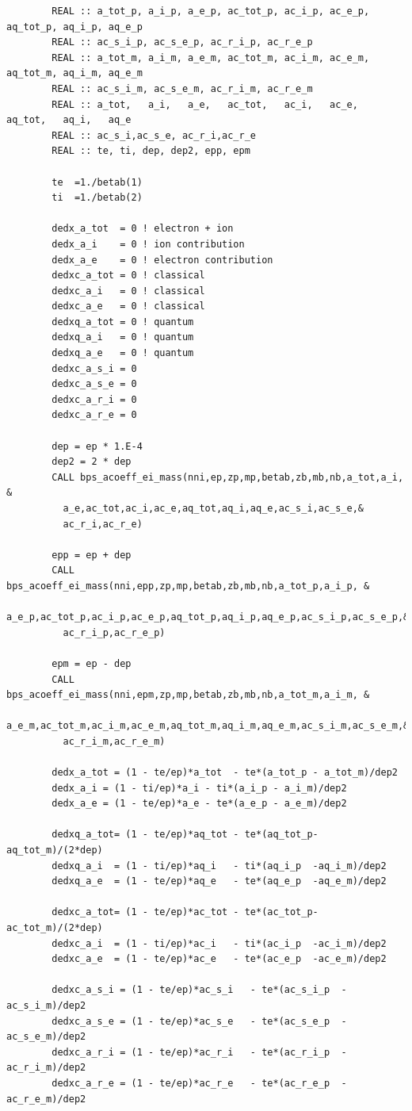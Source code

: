 \documentclass[preprint,12pt,eqsecnum,nofootinbib,amsmath,amssymb]{revtex4}
\begin{document}
{\begin{verbatim}
        REAL :: a_tot_p, a_i_p, a_e_p, ac_tot_p, ac_i_p, ac_e_p, aq_tot_p, aq_i_p, aq_e_p
        REAL :: ac_s_i_p, ac_s_e_p, ac_r_i_p, ac_r_e_p
        REAL :: a_tot_m, a_i_m, a_e_m, ac_tot_m, ac_i_m, ac_e_m, aq_tot_m, aq_i_m, aq_e_m
        REAL :: ac_s_i_m, ac_s_e_m, ac_r_i_m, ac_r_e_m
        REAL :: a_tot,   a_i,   a_e,   ac_tot,   ac_i,   ac_e,   aq_tot,   aq_i,   aq_e
        REAL :: ac_s_i,ac_s_e, ac_r_i,ac_r_e
        REAL :: te, ti, dep, dep2, epp, epm

        te  =1./betab(1)
        ti  =1./betab(2)

        dedx_a_tot  = 0 ! electron + ion
        dedx_a_i    = 0 ! ion contribution
        dedx_a_e    = 0 ! electron contribution
        dedxc_a_tot = 0 ! classical
        dedxc_a_i   = 0 ! classical
        dedxc_a_e   = 0 ! classical
        dedxq_a_tot = 0 ! quantum
        dedxq_a_i   = 0 ! quantum
        dedxq_a_e   = 0 ! quantum
        dedxc_a_s_i = 0 
        dedxc_a_s_e = 0 
        dedxc_a_r_i = 0 
        dedxc_a_r_e = 0 

        dep = ep * 1.E-4
        dep2 = 2 * dep
        CALL bps_acoeff_ei_mass(nni,ep,zp,mp,betab,zb,mb,nb,a_tot,a_i, &
          a_e,ac_tot,ac_i,ac_e,aq_tot,aq_i,aq_e,ac_s_i,ac_s_e,&
          ac_r_i,ac_r_e)

        epp = ep + dep
        CALL bps_acoeff_ei_mass(nni,epp,zp,mp,betab,zb,mb,nb,a_tot_p,a_i_p, &
          a_e_p,ac_tot_p,ac_i_p,ac_e_p,aq_tot_p,aq_i_p,aq_e_p,ac_s_i_p,ac_s_e_p,&
          ac_r_i_p,ac_r_e_p)

        epm = ep - dep
        CALL bps_acoeff_ei_mass(nni,epm,zp,mp,betab,zb,mb,nb,a_tot_m,a_i_m, &
          a_e_m,ac_tot_m,ac_i_m,ac_e_m,aq_tot_m,aq_i_m,aq_e_m,ac_s_i_m,ac_s_e_m,&
          ac_r_i_m,ac_r_e_m)

        dedx_a_tot = (1 - te/ep)*a_tot  - te*(a_tot_p - a_tot_m)/dep2
        dedx_a_i = (1 - ti/ep)*a_i - ti*(a_i_p - a_i_m)/dep2        
        dedx_a_e = (1 - te/ep)*a_e - te*(a_e_p - a_e_m)/dep2

        dedxq_a_tot= (1 - te/ep)*aq_tot - te*(aq_tot_p-aq_tot_m)/(2*dep)
        dedxq_a_i  = (1 - ti/ep)*aq_i   - ti*(aq_i_p  -aq_i_m)/dep2
        dedxq_a_e  = (1 - te/ep)*aq_e   - te*(aq_e_p  -aq_e_m)/dep2

        dedxc_a_tot= (1 - te/ep)*ac_tot - te*(ac_tot_p-ac_tot_m)/(2*dep)        
        dedxc_a_i  = (1 - ti/ep)*ac_i   - ti*(ac_i_p  -ac_i_m)/dep2
        dedxc_a_e  = (1 - te/ep)*ac_e   - te*(ac_e_p  -ac_e_m)/dep2
        
        dedxc_a_s_i = (1 - te/ep)*ac_s_i   - te*(ac_s_i_p  -ac_s_i_m)/dep2
        dedxc_a_s_e = (1 - te/ep)*ac_s_e   - te*(ac_s_e_p  -ac_s_e_m)/dep2
        dedxc_a_r_i = (1 - te/ep)*ac_r_i   - te*(ac_r_i_p  -ac_r_i_m)/dep2
        dedxc_a_r_e = (1 - te/ep)*ac_r_e   - te*(ac_r_e_p  -ac_r_e_m)/dep2


\end{verbatim}}
\end{document}
